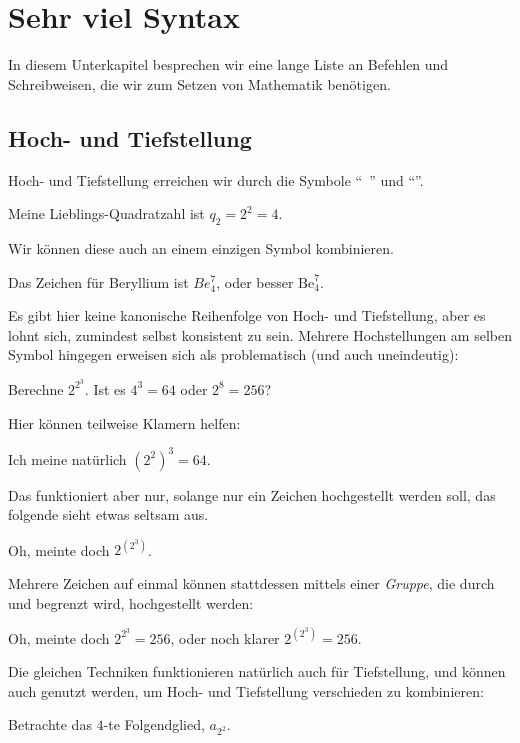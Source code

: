 \section{Sehr viel Syntax}
In diesem Unterkapitel besprechen wir eine lange Liste an Befehlen und Schreibweisen, die wir zum Setzen von Mathematik benötigen.

\subsection{Hoch- und Tiefstellung}
Hoch- und Tiefstellung erreichen wir durch die Symbole \enquote{~\key{\^}} und \enquote{\key{\_}}.
\begin{latexlisting}
	Meine Lieblings-Quadratzahl ist $q_2 = 2^2 = 4$.
\end{latexlisting}
Wir können diese auch an einem einzigen Symbol kombinieren.
\begin{latexlisting}
	Das Zeichen für Beryllium ist $Be^7_4$, oder besser $\mathrm{Be}^7_4$.
\end{latexlisting}
Es gibt hier keine kanonische Reihenfolge von Hoch- und Tiefstellung, aber es lohnt sich, zumindest selbst konsistent zu sein.
Mehrere Hochstellungen am selben Symbol hingegen erweisen sich als problematisch (und auch uneindeutig):
\begin{latexlisting}
	Berechne $2^2^3$. Ist es $4^3 = 64$ oder $2^8 = 256$?
\end{latexlisting}
Hier können teilweise Klamern helfen:
\begin{latexlisting}
	Ich meine natürlich $(2^2)^3 = 64$.
\end{latexlisting}
Das funktioniert aber nur, solange nur ein Zeichen hochgestellt werden soll, das folgende sieht etwas seltsam aus.
\begin{latexlisting}
	Oh, meinte doch $2^(2^3)$.
\end{latexlisting}
Mehrere Zeichen auf einmal können stattdessen mittels einer \emph{Gruppe}, die durch \key{\{} und \key{\}} begrenzt wird, hochgestellt werden:
\begin{latexlisting}
	Oh, meinte doch $2^{2^3} = 256$, oder noch klarer $2^{(2^3)} = 256$.
\end{latexlisting}
Die gleichen Techniken funktionieren natürlich auch für Tiefstellung, und können auch genutzt werden, um Hoch- und Tiefstellung verschieden zu kombinieren:
\begin{latexlisting}
	Betrachte das $4$-te Folgendglied, $a_{2^2}$.
\end{latexlisting}

